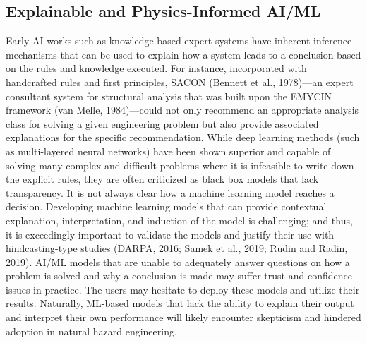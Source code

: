 \subsection{Explainable and Physics-Informed AI/ML}

Early AI works such as knowledge-based expert systems have inherent inference mechanisms that can be used to explain how a system leads to a conclusion based on the rules and knowledge executed. For instance, incorporated with handcrafted rules and first principles, SACON (Bennett et al., 1978)—an expert consultant system for structural analysis that was built upon the EMYCIN framework (van Melle, 1984)—could not only recommend an appropriate analysis class for solving a given engineering problem but also provide associated explanations for the specific recommendation. While deep learning methods (such as multi-layered neural networks) have been shown superior and capable of solving many complex and difficult problems where it is infeasible to write down the explicit rules, they are often criticized as black box models that lack transparency. It is not always clear how a machine learning model reaches a decision. Developing machine learning models that can provide contextual explanation, interpretation, and induction of the model is challenging; and thus, it is exceedingly important to validate the models and justify their use with hindcasting-type studies (DARPA, 2016; Samek et al., 2019; Rudin and Radin, 2019). AI/ML models that are unable to adequately answer questions on how a problem is solved and why a conclusion is made may suffer trust and confidence issues in practice. The users may hesitate to deploy these models and utilize their results. Naturally, ML-based models that lack the ability to explain their output and interpret their own performance will likely encounter skepticism and hindered adoption in natural hazard engineering. 

